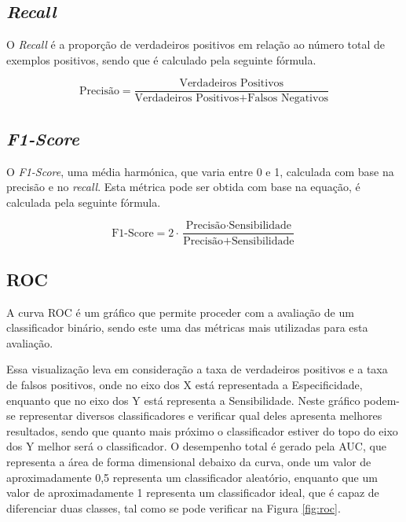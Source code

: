 \documentclass[12pt,a4paper,twoside]{report}
\begin{document}
{\subsection{\textit{Recall}}

O \textit{Recall} é a proporção de verdadeiros positivos em relação
ao número total de exemplos positivos, sendo que é calculado pela seguinte fórmula.

\begin{equation}
\text{Precisão} = \frac{\text{Verdadeiros Positivos}}{\text{Verdadeiros Positivos} + \text{Falsos Negativos}}
\end{equation}

\subsection{\textit{F1-Score}}

O \textit{F1-Score}, uma média harmónica, que varia entre 0 e 1, calculada com base na precisão e no \textit{recall}. Esta métrica pode ser obtida com base na equação, é calculada pela seguinte fórmula.


\begin{equation}
\text{F1-Score} = 2 \cdot \frac{\text{Precisão} \cdot \text{Sensibilidade}}{\text{Precisão} + \text{Sensibilidade}}
\end{equation}

\subsection{\gls{ROC}}

A curva \gls{ROC} é um gráfico que permite proceder com a avaliação de um classificador binário, sendo este uma das métricas mais utilizadas para esta avaliação. 

Essa visualização leva em consideração a taxa de verdadeiros positivos e a taxa de falsos positivos, onde no eixo dos X está representada a Especificidade, enquanto que no eixo dos Y está representa a Sensibilidade. Neste gráfico podem-se representar diversos classificadores e verificar qual deles apresenta melhores resultados, sendo que quanto mais próximo o classificador estiver do topo do eixo dos Y melhor será o classificador. O desempenho total é gerado pela \gls{AUC}, que representa a área de forma dimensional debaixo da curva, onde um valor de aproximadamente 0,5 representa um classificador aleatório, enquanto que um valor de aproximadamente 1 representa um classificador ideal, que é capaz de diferenciar duas classes, tal como se pode verificar na Figura \ref{fig:roc}.


}
\end{document}
